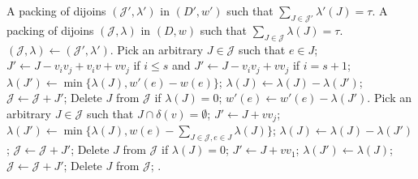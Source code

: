 \documentclass[runningheads]{llncs}
\begin{document}
\begin{algorithm}[htbp]
		\caption{{\sc MappingBack}}
		\begin{algorithmic}[1]
			\Require A packing of dijoins $(\mathcal{J}',\lambda')$ in $(D',w')$ such that $\sum_{J\in\mathcal{J}'}\lambda'(J)=\tau$.
			\Ensure A packing of dijoins $(\mathcal{J},\lambda)$ in $(D,w)$ such that $\sum_{J\in\mathcal{J}}\lambda(J)=\tau$.
                \State $(\mathcal{J},\lambda)\gets (\mathcal{J}',\lambda')$.
                \State Pick an arbitrary $J\in\mathcal{J}$ such that $e\in J$;
                \State $J'\gets J-v_iv_j+v_iv+vv_j$ if $i\leq s$ and $J'\gets J-v_iv_j+vv_j$ if $i=s+1$;
                \State $\lambda(J')\gets \min\{\lambda(J),w'(e)-w(e)\}$;
                \State $\lambda(J)\gets\lambda(J)-\lambda(J')$;
                \State $\mathcal{J}\gets \mathcal{J}+J'$;
                \State Delete $J$ from $\mathcal{J}$ if $\lambda(J)=0$;
                \State $w'(e)\gets w'(e)-\lambda(J')$.
                \EndWhile
            \EndFor
                \State Pick an arbitrary $J\in\mathcal{J}$ such that $J\cap \delta(v)=\emptyset$;
                \State $J'\gets J+vv_j$;
                \State $\lambda(J')\gets \min\{\lambda(J),w(e)-\sum_{J\in\mathcal{J}, e\in J}\lambda(J)\}$;
                \State $\lambda(J)\gets\lambda(J)-\lambda(J')$;
                \State $\mathcal{J}\gets \mathcal{J}+J'$;
                \State Delete $J$ from $\mathcal{J}$ if $\lambda(J)=0$;
                \EndWhile
            \EndFor
        \State $J'\gets J+vv_1$;
        \State $\lambda(J')\gets \lambda(J)$;
        \State $\mathcal{J}\gets \mathcal{J}+J'$;
        \State Delete $J$ from $\mathcal{J}$;
        \EndFor
    \EndIf
    \State {}.
    \end{algorithmic}
  \label{alg:support}
	\end{algorithm}
\end{document}
